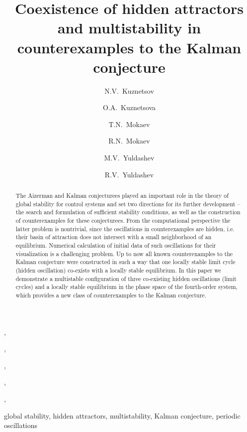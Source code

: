 \documentclass{ifacconf}
\theoremstyle{plain}
\begin{document}
\begin{frontmatter}

\title{Coexistence of hidden attractors and multistability in counterexamples to the Kalman conjecture}


\author[spbu,jyv,ipme]{N.V.~Kuznetsov},
\author[spbu]{O.A.~Kuznetsova},
\author[spbu]{T.N.~Mokaev},
\author[spbu,jyv]{R.N.~Mokaev},
\author[spbu]{M.V.~Yuldashev},
\author[spbu]{R.V.~Yuldashev}

\address[spbu]{Faculty of Mathematics and Mechanics, \\ St. Petersburg State University, Russia}
\address[jyv]{Dept. of Mathematical Information Technology,\\
University of Jyv\"{a}skyl\"{a}, Jyv\"{a}skyl\"{a}, Finland}
\address[ipme]{Institute for Problems in Mechanical Engineering RAS, Russia}

\begin{abstract}                %
The Aizerman and Kalman conjecturees played an important role in
the theory of global stability for control systems
and set two directions for its further development --
the search and formulation of sufficient stability conditions,
as well as the construction of counterexamples for these conjecturees.
From the computational perspective the latter problem is nontrivial,
since the oscillations in counterexamples are hidden,
i.e. their basin of attraction does not intersect with a small neighborhood of an equilibrium.
Numerical calculation of initial data of such oscillations for their visualization
is a challenging problem.
Up to now all known counterexamples to the Kalman conjecture were constructed in such a way
that one locally stable limit cycle (hidden oscillation) co-exists with a locally stable equilibrium.
In this paper we demonstrate a multistable configuration of three co-existing hidden oscillations
(limit cycles) and a locally stable equilibrium
in the phase space of the fourth-order system, which provides
a new class of counterexamples to the Kalman conjecture.
\end{abstract}

\begin{keyword}
global stability, hidden attractors, multistability, Kalman conjecture, periodic oscillations
\end{keyword}

\end{frontmatter}
\end{document}
